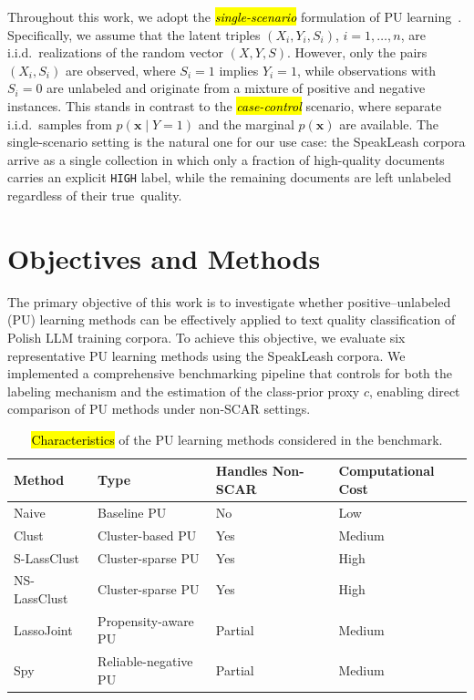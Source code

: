 \documentclass[applsci,article,accept,pdftex,moreauthors]{Definitions/mdpi}
\newcommand{\rev}[1]{{#1}}
\begin{document}
Throughout this work, we adopt the \emph{\hl{single-scenario}} formulation of PU learning~\cite{bekker2020survey}. Specifically, we assume that the latent triples $(X_i,Y_i,S_i)$, $i=1,\ldots,n$, are i.i.d.\ realizations of the random vector $(X,Y,S)$. However, only the pairs $(X_i,S_i)$ are observed, where $S_i=1$ implies $Y_i=1$, while observations with $S_i=0$ are unlabeled and originate from a mixture of positive and negative instances. This stands in contrast to the \emph{\hl{case-control}} scenario, where separate i.i.d.\ samples from $p(\mathbf{x}\mid Y=1)$ and   the marginal $p(\mathbf{x})$ are available. \rev{The single-scenario setting is the natural one for our use case: the SpeakLeash corpora arrive as a single collection in which only a fraction of high-quality documents carries an explicit \texttt{HIGH} label, while the remaining documents are left unlabeled regardless of their \mbox{true quality.}}

\section{Objectives and Methods}

\rev{The primary objective of this work is to investigate whether positive--unlabeled (PU) learning methods can be effectively applied to text quality classification of Polish LLM training corpora.} \rev{To achieve this objective, we evaluate six representative PU learning methods using the SpeakLeash corpora.} We implemented a comprehensive benchmarking pipeline that controls for both the labeling mechanism and the estimation of the class-prior proxy $c$, enabling direct comparison of PU methods under non-SCAR settings.

\begin{table}[H]
\caption{\hl{Characteristics} %
 of the PU learning methods considered in the benchmark.}
\label{tab:method_summary}
\begin{tabularx}{\columnwidth}{llll}
\toprule
\textbf{Method} & \textbf{Type} & \textbf{Handles Non-SCAR} & \textbf{Computational Cost} \\
\midrule
Naive           & Baseline PU              & No      & Low    \\
Clust           & Cluster-based PU         & Yes     & Medium \\
S-LassClust     & Cluster-sparse PU        & Yes     & High   \\
NS-LassClust    & Cluster-sparse PU        & Yes     & High   \\
LassoJoint      & Propensity-aware PU      & Partial & Medium \\
Spy             & Reliable-negative PU     & Partial & Medium \\
\bottomrule
\end{tabularx}
\end{table}
\end{document}
